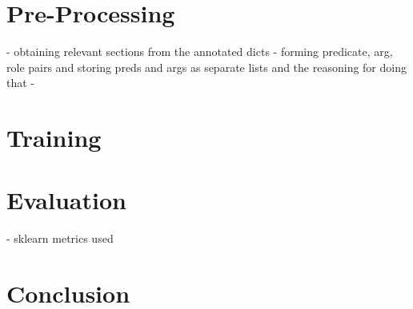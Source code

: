 \documentclass{article}
\begin{document}
\section{Pre-Processing}
- obtaining relevant sections from the annotated dicts
- forming predicate, arg, role pairs and storing preds and args as separate lists and the reasoning for doing that
-
\section{Training}

\section{Evaluation}
- sklearn metrics used

\section{Conclusion}
\end{document}
